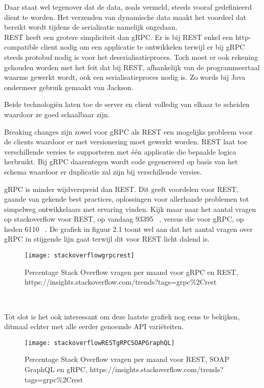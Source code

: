 Daar staat wel tegenover dat de data, zoals vermeld, steeds vooraf gedefinieerd dient te worden.
Het verzenden van dynamische data maakt het voordeel dat bereikt wordt tijdens de serialisatie namelijk ongedaan.\\

REST heeft een grotere simpliciteit dan gRPC. Er is bij REST enkel een http-compatible client nodig om een applicatie te ontwikkelen terwijl
er bij gRPC steeds protobuf nodig is voor het deserialisatieproces. Toch moet er ook rekening gehouden worden met het feit dat bij REST,
afhankelijk van de programmeertaal waarme gewerkt wordt, ook een serialisatieproces nodig is. Zo words bij Java ondermeer gebruik gemaakt van Jackson.\newline
~\autocite{jackson}

Beide technologi\"en laten toe de server en client volledig van elkaar te scheiden waardoor ze goed schaalbaar zijn.

Breaking changes zijn zowel voor gRPC als REST een mogelijks probleem voor de clients waardoor er met versionering moet gewerkt worden.
REST laat toe verschillende versies te supporteren met \'e\'en applicatie die bepaalde logica herbruikt. Bij gRPC daarentegen wordt code gegenereerd op basis van
het schema waardoor er duplicatie zal zijn bij verschillende versies.\newline
~\autocite{grpcversion}

gRPC is minder wijdverspreid dan REST. Dit geeft voordelen voor REST, gaande van gekende best practices, oplossingen voor allerhande problemen
tot simpelweg ontwikkelaars met ervaring vinden. Kijk maar naar het aantal vragen op stackoverflow voor REST, op vandaag 93395 ~\parencite{stackrest},
versus die voor gRPC, op heden 6110 ~\parencite{stackgrpc}. De grafiek in figuur 2.1 toont wel aan dat het aantal vragen over gRPC in stijgende lijn gaat terwijl
dit voor REST licht dalend is.
\begin{figure}[ht]
    \centering
    \texttt{[image: stackoverflowgrpcrest]}
    \caption{Percentage Stack Overflow vragen per maand voor gRPC en REST,\newline
    https://insights.stackoverflow.com/trends?tags=grpc\%2Crest}
\end{figure}\\
\nocite{stackoverflowRESTgRPC}

Tot slot is het ook interessant om deze laatste grafiek nog eens te bekijken, ditmaal echter met alle eerder genoemde API vari\"eteiten.

\begin{figure}[ht]
    \centering
    \texttt{[image: stackoverflowRESTgRPCSOAPGraphQL]}
    \caption{Percentage Stack Overflow vragen per maand voor REST, SOAP GraphQL en gRPC,\newline
    https://insights.stackoverflow.com/trends?tags=grpc\%2Crest}
\end{figure}
\nocite{stackoverflowRESTgRPCSOAPGraphQL}

